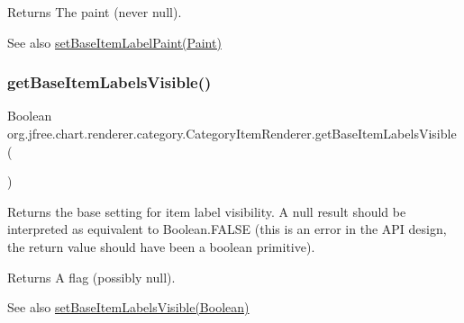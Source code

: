 \begin{DoxyReturn}{Returns}
The paint (never {\ttfamily null}).
\end{DoxyReturn}
\begin{DoxySeeAlso}{See also}
\mbox{\hyperlink{interfaceorg_1_1jfree_1_1chart_1_1renderer_1_1category_1_1_category_item_renderer_a51d5ebfa3ec0fa1b1ed5ab9ac945c211}{set\+Base\+Item\+Label\+Paint(\+Paint)}} 
\end{DoxySeeAlso}
\mbox{\label{interfaceorg_1_1jfree_1_1chart_1_1renderer_1_1category_1_1_category_item_renderer_a2d90e661b0f4c361b2f378293310a3e6}} 
\subsubsection{\texorpdfstring{get\+Base\+Item\+Labels\+Visible()}{getBaseItemLabelsVisible()}}
{\footnotesize\ttfamily Boolean org.\+jfree.\+chart.\+renderer.\+category.\+Category\+Item\+Renderer.\+get\+Base\+Item\+Labels\+Visible (\begin{DoxyParamCaption}{ }\end{DoxyParamCaption})}

Returns the base setting for item label visibility. A {\ttfamily null} result should be interpreted as equivalent to {\ttfamily Boolean.\+F\+A\+L\+SE} (this is an error in the A\+PI design, the return value should have been a boolean primitive).

\begin{DoxyReturn}{Returns}
A flag (possibly {\ttfamily null}).
\end{DoxyReturn}
\begin{DoxySeeAlso}{See also}
\mbox{\hyperlink{interfaceorg_1_1jfree_1_1chart_1_1renderer_1_1category_1_1_category_item_renderer_aa5ff4e5470281bba0293eaf802fb114d}{set\+Base\+Item\+Labels\+Visible(\+Boolean)}} 
\end{DoxySeeAlso}
\mbox{\label{interfaceorg_1_1jfree_1_1chart_1_1renderer_1_1category_1_1_category_item_renderer_a87008cf9d5718483e89d13b93521d1c2}} 

